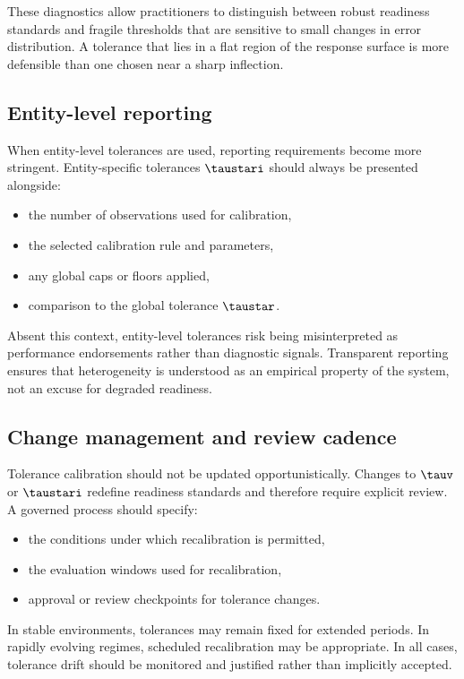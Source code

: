 These diagnostics allow practitioners to distinguish between robust readiness
standards and fragile thresholds that are sensitive to small changes in error
distribution.
A tolerance that lies in a flat region of the response surface is more defensible
than one chosen near a sharp inflection.

\subsection{Entity-level reporting}
\label{subsec:entity_reporting}

When entity-level tolerances are used, reporting requirements become more
stringent.
Entity-specific tolerances $\taustari$ should always be presented alongside:
\begin{itemize}[leftmargin=*]
    \item the number of observations used for calibration,
    \item the selected calibration rule and parameters,
    \item any global caps or floors applied,
    \item comparison to the global tolerance $\taustar$.
\end{itemize}

Absent this context, entity-level tolerances risk being misinterpreted as
performance endorsements rather than diagnostic signals.
Transparent reporting ensures that heterogeneity is understood as an empirical
property of the system, not an excuse for degraded readiness.

\subsection{Change management and review cadence}
\label{subsec:change_management}

Tolerance calibration should not be updated opportunistically.
Changes to $\tauv$ or $\taustari$ redefine readiness standards and therefore
require explicit review.
A governed process should specify:
\begin{itemize}[leftmargin=*]
    \item the conditions under which recalibration is permitted,
    \item the evaluation windows used for recalibration,
    \item approval or review checkpoints for tolerance changes.
\end{itemize}

In stable environments, tolerances may remain fixed for extended periods.
In rapidly evolving regimes, scheduled recalibration may be appropriate.
In all cases, tolerance drift should be monitored and justified rather than
implicitly accepted.

